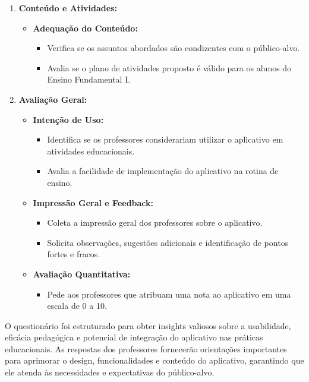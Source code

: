 \begin{enumerate}
\begin{itemize}
    \end{itemize}
    \item \textbf{Conteúdo e Atividades:}
    \begin{itemize}
        \item \textbf{Adequação do Conteúdo:}
        \begin{itemize}
            \item Verifica se os assuntos abordados são condizentes com o público-alvo.
            \item Avalia se o plano de atividades proposto é válido para os alunos do Ensino Fundamental I.
        \end{itemize}
    \end{itemize}
    \item \textbf{Avaliação Geral:}
    \begin{itemize}
        \item \textbf{Intenção de Uso:}
        \begin{itemize}
            \item Identifica se os professores considerariam utilizar o aplicativo em atividades educacionais.
            \item Avalia a facilidade de implementação do aplicativo na rotina de ensino.
        \end{itemize}
        \item \textbf{Impressão Geral e Feedback:}
        \begin{itemize}
            \item Coleta a impressão geral dos professores sobre o aplicativo.
            \item Solicita observações, sugestões adicionais e identificação de pontos fortes e fracos.
        \end{itemize}
        \item \textbf{Avaliação Quantitativa:}
        \begin{itemize}
            \item Pede aos professores que atribuam uma nota ao aplicativo em uma escala de 0 a 10.
        \end{itemize}
    \end{itemize}
\end{enumerate}

O questionário foi estruturado para obter insights valiosos sobre a usabilidade, eficácia pedagógica e potencial de integração do aplicativo nas práticas educacionais. As respostas dos professores fornecerão orientações importantes para aprimorar o design, funcionalidades e conteúdo do aplicativo, garantindo que ele atenda às necessidades e expectativas do público-alvo.

